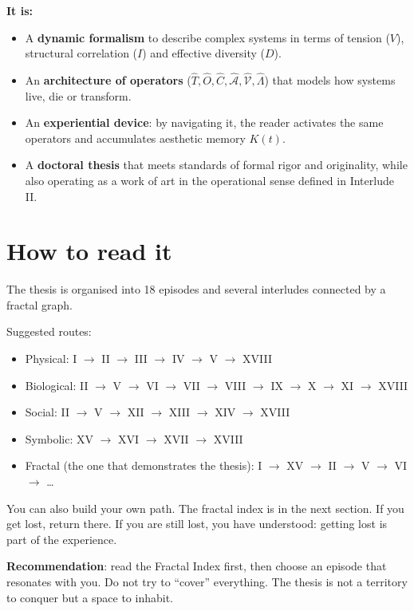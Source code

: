 \documentclass[12pt,oneside]{report}
\begin{document}
\textbf{It is:}
\begin{itemize}
\item A \textbf{dynamic formalism} to describe complex systems in terms of tension (\(V\)), structural correlation (\(I\)) and effective diversity (\(D\)).
\item An \textbf{architecture of operators} (\(\hat{T}, \hat{O}, \hat{C}, \hat{\mathcal{A}}, \hat{\mathcal{V}}, \hat{\Lambda}\)) that models how systems live, die or transform.
\item An \textbf{experiential device}: by navigating it, the reader activates the same operators and accumulates aesthetic memory \(K(t)\).
\item A \textbf{doctoral thesis} that meets standards of formal rigor and originality, while also operating as a work of art in the operational sense defined in Interlude II.
\end{itemize}

\section*{How to read it}

The thesis is organised into 18 episodes and several interludes connected by a fractal graph.

Suggested routes:
\begin{itemize}
\item Physical: I \(\to\) II \(\to\) III \(\to\) IV \(\to\) V \(\to\) XVIII
\item Biological: II \(\to\) V \(\to\) VI \(\to\) VII \(\to\) VIII \(\to\) IX \(\to\) X \(\to\) XI \(\to\) XVIII
\item Social: II \(\to\) V \(\to\) XII \(\to\) XIII \(\to\) XIV \(\to\) XVIII
\item Symbolic: XV \(\to\) XVI \(\to\) XVII \(\to\) XVIII
\item Fractal (the one that demonstrates the thesis): I \(\to\) XV \(\to\) II \(\to\) V \(\to\) VI \(\to\) \dots
\end{itemize}

You can also build your own path. The fractal index is in the next section. If you get lost, return there. If you are still lost, you have understood: getting lost is part of the experience.

\textbf{Recommendation}: read the Fractal Index first, then choose an episode that resonates with you. Do not try to “cover” everything. The thesis is not a territory to conquer but a space to inhabit.
\end{document}
